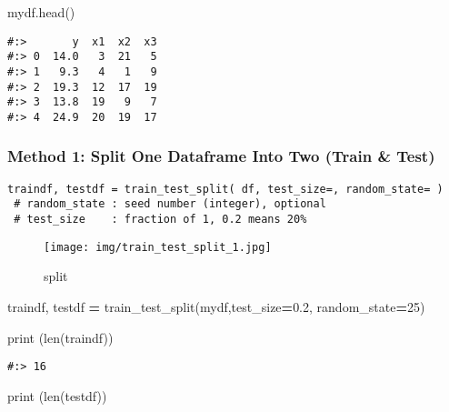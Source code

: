 \documentclass[
]{book}
\newenvironment{Shaded}{\begin{snugshade}}{\end{snugshade}}
\newcommand{\BuiltInTok}[1]{#1}
\newcommand{\DecValTok}[1]{\textcolor[rgb]{0.06,0.06,0.06}{#1}}
\newcommand{\FloatTok}[1]{\textcolor[rgb]{0.06,0.06,0.06}{#1}}
\newcommand{\NormalTok}[1]{#1}
\newcommand{\OperatorTok}[1]{\textcolor[rgb]{0.43,0.43,0.43}{\textbf{#1}}}
\begin{document}
\begin{Shaded}
\begin{Highlighting}[]
\NormalTok{mydf.head()}
\end{Highlighting}
\end{Shaded}

\begin{verbatim}
#:>       y  x1  x2  x3
#:> 0  14.0   3  21   5
#:> 1   9.3   4   1   9
#:> 2  19.3  12  17  19
#:> 3  13.8  19   9   7
#:> 4  24.9  20  19  17
\end{verbatim}

\hypertarget{method-1-split-one-dataframe-into-two-train-test}{%
\subsubsection{Method 1: Split One Dataframe Into Two (Train \& Test)}\label{method-1-split-one-dataframe-into-two-train-test}}

\begin{verbatim}
traindf, testdf = train_test_split( df, test_size=, random_state= ) 
 # random_state : seed number (integer), optional
 # test_size    : fraction of 1, 0.2 means 20%
\end{verbatim}

\begin{figure}
\centering
\texttt{[image: img/train\_test\_split\_1.jpg]}
\caption{split}
\end{figure}

\begin{Shaded}
\begin{Highlighting}[]
\NormalTok{traindf, testdf }\OperatorTok{=}\NormalTok{ train\_test\_split(mydf,test\_size}\OperatorTok{=}\FloatTok{0.2}\NormalTok{, random\_state}\OperatorTok{=}\DecValTok{25}\NormalTok{)}
\end{Highlighting}
\end{Shaded}

\begin{Shaded}
\begin{Highlighting}[]
\BuiltInTok{print}\NormalTok{ (}\BuiltInTok{len}\NormalTok{(traindf))}
\end{Highlighting}
\end{Shaded}

\begin{verbatim}
#:> 16
\end{verbatim}

\begin{Shaded}
\begin{Highlighting}[]
\BuiltInTok{print}\NormalTok{ (}\BuiltInTok{len}\NormalTok{(testdf))}
\end{Highlighting}
\end{Shaded}
\end{document}
